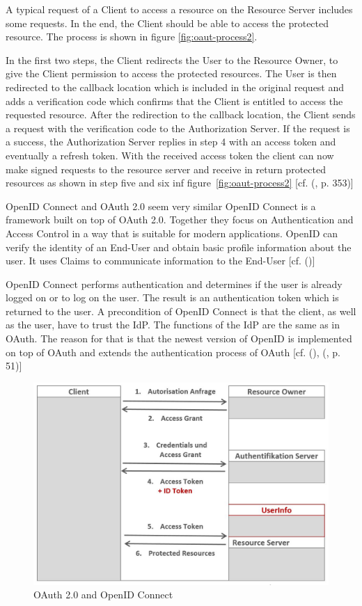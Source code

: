 {{		A typical request of a Client to access a resource on the Resource Server includes some requests. In the end, the Client should be able to access the protected resource. The process is shown in figure \ref{fig:oaut-process2}.
			
		In the first two steps, the Client redirects the User to the Resource Owner, to give the Client permission to access the protected resources. The User is then redirected to the callback location which is included in the original request and adds a verification code which confirms that the Client is entitled to access the requested resource. After the redirection to the callback location, the Client sends a request with the verification code to the Authorization Server. If the request is a success, the Authorization Server replies in step 4 with an access token and eventually a refresh token. With the received access token the client can now make signed requests to the resource server and receive in return protected resources as shown in step five and six inf figure~\ref{fig:oaut-process2} [cf. (\cite{LeBlanc:2011:SocialApplications}, p. 353)]
		
		
		OpenID Connect and OAuth 2.0 seem very similar OpenID Connect is a framework built on top of OAuth 2.0. Together they focus on Authentication and Access Control in a way that is suitable for modern applications. OpenID can verify the identity of an End-User and obtain basic profile information about the user. It uses Claims to communicate information to the End-User [cf. (\cite{Sakimura:2014:OpenIDConnect})]
		
		OpenID Connect performs authentication and determines if the user is already logged on or to log on the user. The result is an authentication token which is returned to the user. A precondition of OpenID Connect is that the client, as well as the user, have to trust the IdP. The functions of the IdP are the same as in OAuth. The reason for that is that the newest version of OpenID is implemented on top of OAuth and extends the authentication process of OAuth  [cf. (\cite{Sakimura:2014:OpenIDConnect}), (\cite{Boyd:2012:GSOAuth}, p. 51)]
		
		\begin{figure}[h]
			\centering
			\includegraphics[width=0.8\linewidth]{images/openid-process}
			\caption{OAuth 2.0 and OpenID Connect \cite{Lodderstedt:2014:OpenID}}
			\label{fig:openid-process}
		\end{figure}
		
}}
